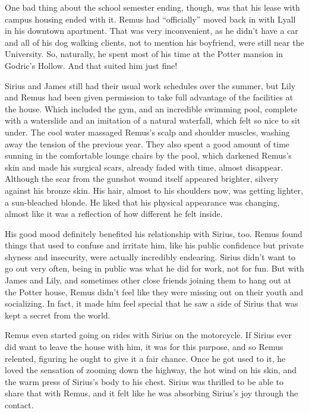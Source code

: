 \documentclass[12pt,twoside,openright]{memoir}
\begin{document}
One bad thing about the school semester ending, though, was that his lease with campus housing ended with it. Remus had
``officially'' moved back in with Lyall in his downtown apartment. That was very inconvenient, as he didn't have a car and all of his dog walking clients, not to mention his boyfriend, were still near the University. So, naturally, he spent most of his time at the Potter mansion in Godric's Hollow. And that suited him just fine!

Sirius and James still had their usual work schedules over the summer, but Lily and Remus had been given permission to take full advantage of the facilities at the house. Which included the gym, and an incredible swimming pool, complete with a waterslide and an imitation of a natural waterfall, which felt so nice to sit under. The cool water massaged Remus's scalp and shoulder muscles, washing away the tension of the previous year. They also spent a good amount of time sunning in the comfortable lounge chairs by the pool, which darkened Remus's skin and made his surgical scars, already faded with time, almost disappear. Although the scar from the gunshot wound itself appeared brighter, silvery against his bronze skin. His hair, almost to his shoulders now, was getting lighter, a sun-bleached blonde. He liked that his physical appearance was changing, almost like it was a reflection of how different he felt inside.

His good mood definitely benefited his relationship with Sirius, too. Remus found things that used to confuse and irritate him, like his public confidence but private shyness and insecurity, were actually incredibly endearing. Sirius didn't want to go out very often, being in public was what he did for work, not for fun. But with James and Lily, and sometimes other close friends joining them to hang out at the Potter house, Remus didn't feel like they were missing out on their youth and socializing. In fact, it made him feel special that he saw a side of Sirius that was kept a secret from the world. 

Remus even started going on rides with Sirius on the motorcycle. If Sirius ever did want to leave the house with him, it was for this purpose, and so Remus relented, figuring he ought to give it a fair chance. Once he got used to it, he loved the sensation of zooming down the highway, the hot wind on his skin, and the warm press of Sirius's body to his chest. Sirius was thrilled to be able to share that with Remus, and it felt like he was absorbing Sirius's joy through the contact.
\end{document}
